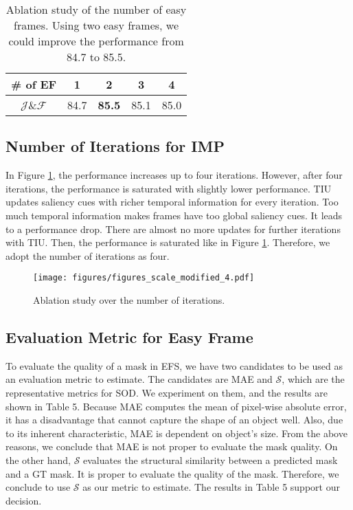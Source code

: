 \documentclass[letterpaper]{article} \usepackage{aaai22}  \usepackage{times}  \usepackage{helvet}  \usepackage{courier}  \usepackage[hyphens]{url}  \usepackage{graphicx} \urlstyle{rm} \def\UrlFont{\rm}  \usepackage{natbib}  \usepackage{caption} \DeclareCaptionStyle{ruled}{labelfont=normalfont,labelsep=colon,strut=off} \frenchspacing  \setlength{\pdfpagewidth}{8.5in}  \setlength{\pdfpageheight}{11in}  \usepackage{algorithm}
\begin{document}
\begin{table}[h]
\centering
\caption{Ablation study of the number of easy frames. Using two easy frames, we could improve the performance from 84.7 to 85.5.}
\begin{tabular}{@{}c|cccc@{}}
\toprule
\# of EF & 1    & 2             & 3    & 4    \\ \midrule
$\mathcal{J}$\&$\mathcal{F}$     & 84.7 & \textbf{85.5} & 85.1 & 85.0 \\ \bottomrule
\end{tabular}
\label{table4}
\end{table}

\subsection{Number of Iterations for IMP}

In Figure \ref{figure4}, the performance increases up to four iterations. However, after four iterations, the performance is saturated with slightly lower performance. TIU updates saliency cues with richer temporal information for every iteration. Too much temporal information makes frames have too global saliency cues. It leads to a performance drop. There are almost no more updates for further iterations with TIU. Then, the performance is saturated like in Figure \ref{figure4}. Therefore, we adopt the number of iterations as four.

\begin{figure}[h]
\centering
\texttt{[image: figures/figures\_scale\_modified\_4.pdf]}
\caption{Ablation study over the number of iterations.}
\label{figure4}
\end{figure}

\subsection{Evaluation Metric for Easy Frame}

To evaluate the quality of a mask in EFS, we have two candidates to be used as an evaluation metric to estimate. The candidates are MAE and $\mathcal{S}$, which are the representative metrics for SOD. We experiment on them, and the results are shown in Table 5. Because MAE computes the mean of pixel-wise absolute error, it has a disadvantage that cannot capture the shape of an object well. Also, due to its inherent characteristic, MAE is dependent on object’s size. From the above reasons, we conclude that MAE is not proper to evaluate the mask quality. On the other hand, $\mathcal{S}$ evaluates the structural similarity between a predicted mask and a GT mask. It is proper to evaluate the quality of the mask. Therefore, we conclude to use $\mathcal{S}$ as our metric to estimate. The results in Table 5 support our decision. 
\end{document}
